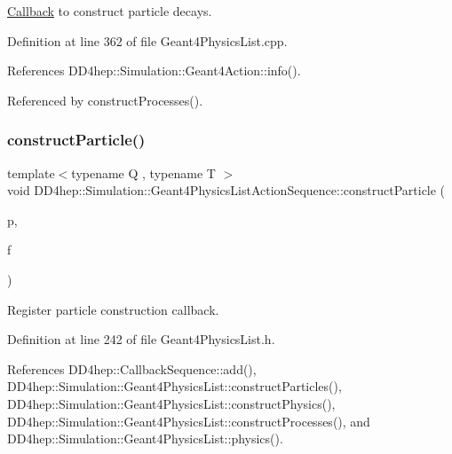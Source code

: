 \hyperlink{class_d_d4hep_1_1_callback}{Callback} to construct particle decays. 



Definition at line 362 of file Geant4\+Physics\+List.\+cpp.



References D\+D4hep\+::\+Simulation\+::\+Geant4\+Action\+::info().



Referenced by construct\+Processes().

\hypertarget{class_d_d4hep_1_1_simulation_1_1_geant4_physics_list_action_sequence_ac93e14a48216ce8a1d9b5b93f642f6ea}{}\label{class_d_d4hep_1_1_simulation_1_1_geant4_physics_list_action_sequence_ac93e14a48216ce8a1d9b5b93f642f6ea} 
\subsubsection{\texorpdfstring{construct\+Particle()}{constructParticle()}}
{\footnotesize\ttfamily template$<$typename Q , typename T $>$ \\
void D\+D4hep\+::\+Simulation\+::\+Geant4\+Physics\+List\+Action\+Sequence\+::construct\+Particle (\begin{DoxyParamCaption}\item[{Q $\ast$}]{p,  }\item[{void(T\+::$\ast$)(G4\+V\+User\+Physics\+List $\ast$)}]{f }\end{DoxyParamCaption})\hspace{0.3cm}{\ttfamily [inline]}}



Register particle construction callback. 



Definition at line 242 of file Geant4\+Physics\+List.\+h.



References D\+D4hep\+::\+Callback\+Sequence\+::add(), D\+D4hep\+::\+Simulation\+::\+Geant4\+Physics\+List\+::construct\+Particles(), D\+D4hep\+::\+Simulation\+::\+Geant4\+Physics\+List\+::construct\+Physics(), D\+D4hep\+::\+Simulation\+::\+Geant4\+Physics\+List\+::construct\+Processes(), and D\+D4hep\+::\+Simulation\+::\+Geant4\+Physics\+List\+::physics().


